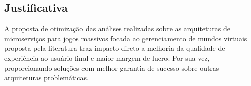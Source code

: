 \subsection{Justificativa}

A proposta de otimização das análises realizadas sobre as arquiteturas de microserviços para jogos massivos focada ao gerenciamento de mundos virtuais proposta pela literatura traz impacto direto a melhoria da qualidade de experiência ao usuário final e maior margem de lucro\cite{1417630}.
%
Por sua vez, proporcionando soluções com melhor garantia de sucesso sobre outras arquiteturas problemáticas.

